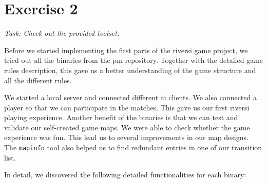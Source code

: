 \section{Exercise 2}
\textit{Task: Check out the provided toolset.} \newline

\noindent Before we started implementing the first parts of the riversi game project, we tried out all the binaries from the pm repository. Together with the detailed game rules description, this gave us a better understanding of the game structure and all the different rules. \newline

\noindent We started a local server and connected different ai clients. We also connected a player so that we can participate in the matches. This gave us our first riversi playing experience. Another benefit of the binaries is that we can test and validate our self-created game maps. We were able to check whether the game experience was fun. This lead us to several improvements in our map designs. The \texttt{mapinfo} tool also helped us to find redundant entries in one of our transition list.
\newline

\noindent In detail, we discovered the following detailed functionalities for each binary:

